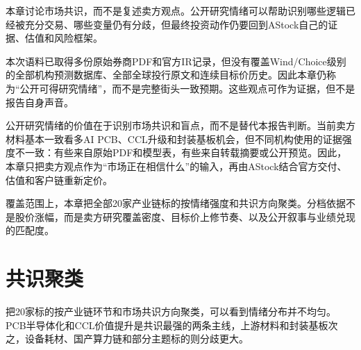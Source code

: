 
本章讨论市场共识，而不是复述卖方观点。公开研究情绪可以帮助识别哪些逻辑已经被充分交易、哪些变量仍有分歧，但最终投资动作仍要回到AStock自己的证据、估值和风险框架。

\begin{sourcequalitybox}[为何本章不是完整街头一致预期]
本次语料已取得多份原始券商PDF和官方IR记录，但没有覆盖Wind/Choice级别的全部机构预测数据库、全部全球投行原文和连续目标价历史。因此本章仍称为``公开可得研究情绪''，而不是完整街头一致预期。这些观点可作为证据，但不是报告自身声音。
\end{sourcequalitybox}

公开研究情绪的价值在于识别市场共识和盲点，而不是替代本报告判断。当前卖方材料基本一致看多AI PCB、CCL升级和封装基板机会，但不同机构使用的证据强度不一致：有些来自原始PDF和模型表，有些来自转载摘要或公开预览。因此，本章只把卖方观点作为``市场正在相信什么''的输入，再由AStock结合官方交付、估值和客户链重新定价。

覆盖范围上，本章把全部20家产业链标的按情绪强度和共识方向聚类。分档依据不是股价涨幅，而是卖方研究覆盖密度、目标价上修节奏、以及公开叙事与业绩兑现的匹配度。

\section{共识聚类}

把20家标的按产业链环节和市场共识方向聚类，可以看到情绪分布并不均匀。PCB半导体化和CCL价值提升是共识最强的两条主线，上游材料和封装基板次之，设备耗材、国产算力链和部分主题标的则分歧更大。

